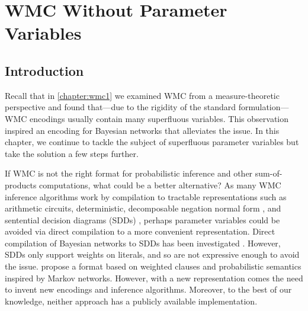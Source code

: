\chapter{WMC Without Parameter Variables}\label{chapter:wmc2}

\section{Introduction}

Recall that in \cref{chapter:wmc1} we examined WMC from a measure-theoretic
perspective and found that---due to the rigidity of the standard
formulation---WMC encodings usually contain many superfluous variables. This
observation inspired an encoding for Bayesian networks that alleviates the
issue. In this chapter, we continue to tackle the subject of superfluous
parameter variables but take the solution a few steps further.

If WMC is not the right format for probabilistic inference and other
sum-of-products computations, what could be a better alternative? As many WMC
inference algorithms \citep{DBLP:conf/ecai/Darwiche04,DBLP:conf/ijcai/OztokD15}
work by compilation to tractable representations such as arithmetic circuits,
deterministic, decomposable negation normal form
\citep{DBLP:journals/jancl/Darwiche01}, and sentential decision diagrams (SDDs)
\citep{DBLP:conf/ijcai/Darwiche11}, perhaps parameter variables could be avoided
via direct compilation to a more convenient representation. Direct compilation
of Bayesian networks to SDDs has been investigated
\citep{DBLP:conf/ecsqaru/ChoiKD13}. However, SDDs only support weights on
literals, and so are not expressive enough to avoid the issue.
 propose a format based on weighted clauses and
probabilistic semantics inspired by Markov networks. However, with a new
representation comes the need to invent new encodings and inference algorithms.
Moreover, to the best of our knowledge, neither approach
\citep{DBLP:conf/ecsqaru/ChoiKD13,DBLP:conf/uai/GogateD10} has a publicly
available implementation.

